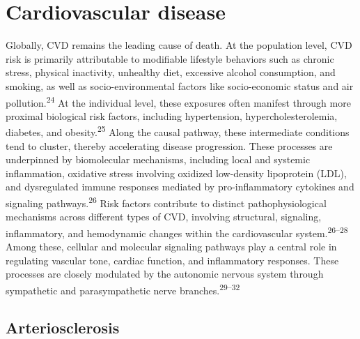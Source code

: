 \documentclass[
  a4paper,
  headsepline=true,
  open=left]{scrbook}
\begin{document}
\hypertarget{cardiovascular-disease}{%
\section{Cardiovascular disease}\label{cardiovascular-disease}}

Globally, CVD remains the leading cause of death. At the population
level, CVD risk is primarily attributable to modifiable lifestyle
behaviors such as chronic stress, physical inactivity, unhealthy diet,
excessive alcohol consumption, and smoking, as well as
socio-environmental factors like socio-economic status and air
pollution.\textsuperscript{24} At the individual level, these exposures
often manifest through more proximal biological risk factors, including
hypertension, hypercholesterolemia, diabetes, and
obesity.\textsuperscript{25} Along the causal pathway, these
intermediate conditions tend to cluster, thereby accelerating disease
progression. These processes are underpinned by biomolecular mechanisms,
including local and systemic inflammation, oxidative stress involving
oxidized low-density lipoprotein (LDL), and dysregulated immune
responses mediated by pro-inflammatory cytokines and signaling
pathways.\textsuperscript{26} Risk factors contribute to distinct
pathophysiological mechanisms across different types of CVD, involving
structural, signaling, inflammatory, and hemodynamic changes within the
cardiovascular system.\textsuperscript{26--28} Among these, cellular and
molecular signaling pathways play a central role in regulating vascular
tone, cardiac function, and inflammatory responses. These processes are
closely modulated by the autonomic nervous system through sympathetic
and parasympathetic nerve branches.\textsuperscript{29--32}

\hypertarget{arteriosclerosis}{%
\subsection{Arteriosclerosis}\label{arteriosclerosis}}
\end{document}
